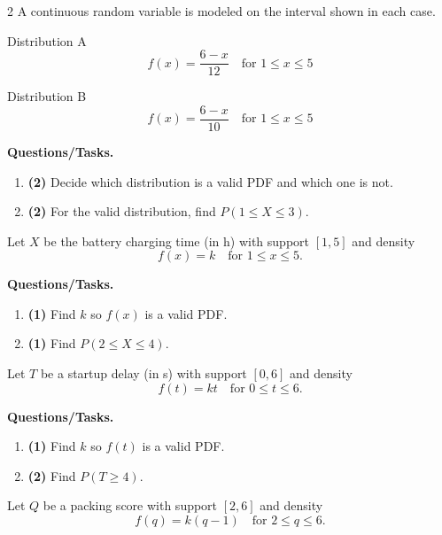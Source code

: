 \begin{multicols}{2}
		\vspace{0.25cm}
		\vspace{-0.3cm}
		A continuous random variable is modeled on the interval shown in each case.
		
		Distribution A
		\[
		f(x)=\frac{6-x}{12}\quad\text{for }1\le x\le 5
		\]
		
		Distribution B
		\[
		f(x)=\frac{6-x}{10}\quad\text{for }1\le x\le 5
		\]
		
		\textbf{Questions/Tasks.}
		\begin{enumerate}[label=\textbf{\alph*)}]
			\item \textbf{(2)} Decide which distribution is a valid PDF and which one is not.
			\item \textbf{(2)} For the valid distribution, find $P(1\le X\le 3)$.
		\end{enumerate}
		
		\vspace{0.25cm}
		\vspace{-0.3cm}
		Let $X$ be the battery charging time (in h) with support $[1,5]$ and density
		\[
		f(x)=k\quad\text{for }1\le x\le 5.
		\]
		
		\textbf{Questions/Tasks.}
		\begin{enumerate}[label=\textbf{\alph*)}]
			\item \textbf{(1)} Find $k$ so $f(x)$ is a valid PDF.
			\item \textbf{(1)} Find $P(2\le X\le 4)$.
		\end{enumerate}
		
		\vspace{0.25cm}
		\vspace{-0.25cm}
		Let $T$ be a startup delay (in s) with support $[0,6]$ and density
		\[
		f(t)=kt\quad\text{for }0\le t\le 6.
		\]
		
		\textbf{Questions/Tasks.}
		\begin{enumerate}[label=\textbf{\alph*)}]
			\item \textbf{(1)} Find $k$ so $f(t)$ is a valid PDF.
			\item \textbf{(2)} Find $P(T\ge 4)$.
		\end{enumerate}
		
		\vspace{0.25cm}
		\vspace{-0.3cm}
		Let $Q$ be a packing score with support $[2,6]$ and density
		\[
		f(q)=k(q-1)\quad\text{for }2\le q\le 6.
		\]
		

\end{multicols}
